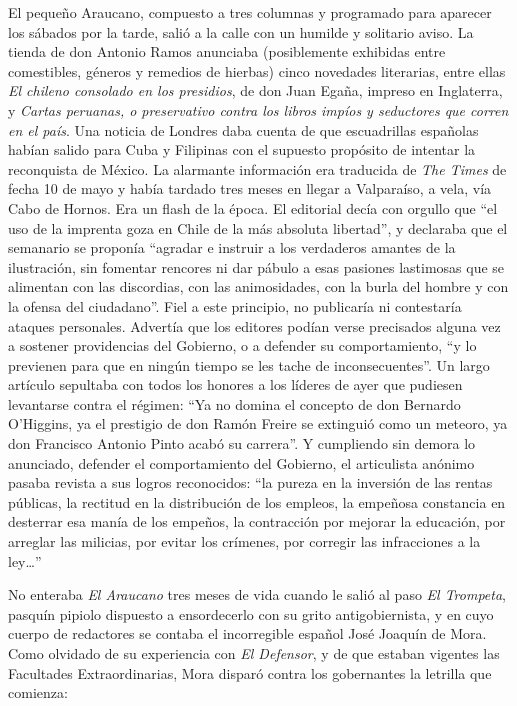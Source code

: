\documentclass[10pt,twoside,openright]{memoir}
\begin{document}
El pequeño Araucano, compuesto a tres columnas y programado para aparecer los
sábados por la tarde, salió a la calle con un humilde y solitario aviso.
La tienda de don Antonio Ramos anunciaba (posiblemente exhibidas entre
comestibles, géneros y remedios de
hierbas) cinco novedades literarias, entre ellas \emph{El chileno
consolado en los presidios}, de don Juan Egaña, impreso en Inglaterra, y
\emph{Cartas peruanas, o preservativo contra los libros impíos y
seductores que corren en el país}. Una noticia de Londres daba cuenta de
que escuadrillas españolas habían salido para Cuba y Filipinas con el
supuesto propósito de intentar la reconquista de México. La alarmante
información era traducida de \emph{The Times} de fecha 10 de mayo y
había tardado tres meses en llegar a Valparaíso, a vela, vía Cabo de
Hornos. Era un flash de la época. El editorial decía con orgullo que
``el uso de la imprenta goza en Chile de la más absoluta libertad'', y
declaraba que el semanario se
proponía ``agradar e instruir a los verdaderos amantes de la
ilustración, sin fomentar rencores ni dar pábulo a esas pasiones
lastimosas que se alimentan con las discordias, con las animosidades,
con la burla del hombre y con la ofensa del ciudadano''. Fiel a este
principio, no publicaría ni contestaría ataques personales. Advertía que
los editores podían verse precisados alguna vez a sostener providencias
del Gobierno, o a defender su comportamiento, ``y lo previenen para que
en ningún tiempo se les tache de inconsecuentes''. Un largo artículo
sepultaba con todos los honores a los líderes de ayer que pudiesen
levantarse contra el régimen: ``Ya no domina el concepto de don Bernardo
O'Higgins, ya el prestigio de don Ramón Freire se extinguió como un
meteoro, ya don Francisco Antonio Pinto acabó su carrera''. Y cumpliendo
sin demora lo anunciado, defender el comportamiento del Gobierno, el
articulista anónimo pasaba revista a
sus logros reconocidos: ``la pureza en la inversión de las rentas
públicas, la rectitud en la distribución de los empleos, la empeñosa
constancia en desterrar esa manía de los empeños, la contracción por
mejorar la educación, por arreglar las milicias, por evitar los
crímenes, por corregir las infracciones a la ley\ldots''

No enteraba \emph{El Araucano} tres meses de vida cuando le salió al paso \emph{El
Trompeta}, pasquín pipiolo dispuesto a ensordecerlo con su grito
antigobiernista, y en cuyo cuerpo de redactores se contaba el
incorregible español José Joaquín de Mora. Como olvidado de su
experiencia con \emph{El Defensor}, y de que estaban vigentes las Facultades
Extraordinarias, Mora disparó contra los gobernantes la letrilla que
comienza:
\end{document}
